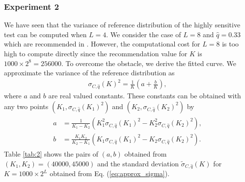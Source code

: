 \documentclass[dvipdfmx,english]{ampmt} %
\begin{document}
\subsubsection{Experiment 2}\label{subsec:4-3}
We have seen that the variance of reference distribution of the highly sensitive test can be computed when $L=4$. We consider the case of $L=8$ and $\hat{q}=0.33$ which are recommended in \cite{yamamoto2016highly}. 
However, the computational cost for $L=8$ is too high to compute directly since the recommendation value for $K$ is $1000\times 2^8 = 256000$.
To overcome the obstacle, we derive the fitted curve. 
%
We approximate the variance of the reference distribution as
\begin{align}\label{eq:approx_sigma}
  \sigma_{C,\hat{q}}(K)^2 = \frac{1}{K} \left( a + \frac{b}{K} \right),
\end{align}
where $a$ and $b$ are real valued constants. 
These constants can be obtained with any two points $(K_1, \sigma_{C,\hat{q}}(K_1)^2)$ and $(K_2, \sigma_{C,\hat{q}}(K_2)^2)$ by
\begin{align}\begin{split}\label{eq:keisuu_ab}
  a &= \frac{1}{K_1-K_2} \left( K_1^2 \sigma_{C,\hat{q}}(K_1)^2 - K_2^2 \sigma_{C,\hat{q}}(K_2)^2  \right), \\
  b &= \frac{K_1K_2}{K_2-K_1} \left( K_1 \sigma_{C,\hat{q}}(K_1)^2 - K_2 \sigma_{C,\hat{q}}(K_2)^2 \right).
\end{split}\end{align}
%
Table \ref{tab:2} shows the pairs of $(a,b)$ obtained from $(K_1,K_2)=(40000,45000)$ and the standard deviation $\tilde{\sigma}_{C,\hat{q}}(K)$ for $K=1000\times2^L$ obtained from Eq. (\ref{eq:approx_sigma}).
%
\end{document}
